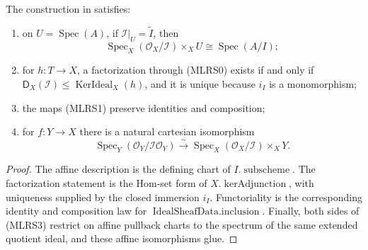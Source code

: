 \begin{lemma}
  \label{lemma:nagata-quotient-relative-spec}

  The construction in  satisfies:
  \begin{enumerate}
    \item on $U=\operatorname{Spec}(A)$, if
      $\mathcal I|_U=\widetilde I$, then
      \[
        \operatorname{Spec}_X(\mathcal O_X/\mathcal I)\times_XU
          \cong\operatorname{Spec}(A/I);                         \tag{MLRS2}
      \]
    \item for $h\colon T\to X$, a factorization through (MLRS0) exists if
      and only if
      $\mathsf D_X(\mathcal I)\leq\operatorname{KerIdeal}_X(h)$, and it is
      unique because
      $i_I$ is a monomorphism;
    \item the maps (MLRS1) preserve identities and composition;
    \item for $f\colon Y\to X$ there is a natural cartesian isomorphism
      \[
        \operatorname{Spec}_Y
          (\mathcal O_Y/\mathcal I\mathcal O_Y)
          \xrightarrow{\sim}
        \operatorname{Spec}_X(\mathcal O_X/\mathcal I)\times_XY. \tag{MLRS3}
      \]
  \end{enumerate}
\end{lemma}

\begin{proof}
  The affine description is the defining chart of
  $I.\operatorname{subscheme}$.  The factorization statement is the Hom-set
  form of $X.\operatorname{kerAdjunction}$, with uniqueness supplied by the
  closed immersion $i_I$.  Functoriality is the
  corresponding identity and composition law for
  $\operatorname{IdealSheafData.inclusion}$.  Finally, both sides of (MLRS3)
  restrict on affine pullback charts to the spectrum of the same extended
  quotient ideal, and these affine isomorphisms glue.
\end{proof}

